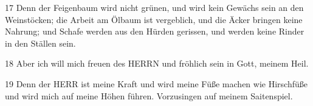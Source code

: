 \par 17 Denn der Feigenbaum wird nicht grünen, und wird kein Gewächs sein an den Weinstöcken; die Arbeit am Ölbaum ist vergeblich, und die Äcker bringen keine Nahrung; und Schafe werden aus den Hürden gerissen, und werden keine Rinder in den Ställen sein.
\par 18 Aber ich will mich freuen des HERRN und fröhlich sein in Gott, meinem Heil.
\par 19 Denn der HERR ist meine Kraft und wird meine Füße machen wie Hirschfüße und wird mich auf meine Höhen führen. Vorzusingen auf meinem Saitenspiel.

